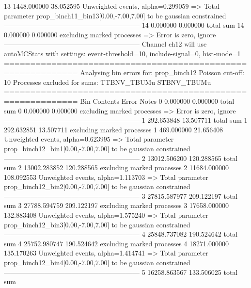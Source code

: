 13         1448.000000     38.052595       Unweighted events, alpha=0.299059
  => Total parameter prop_binch11_bin13[0.00,-7.00,7.00] to be gaussian constrained
------------------------------------------------------------
14         0.000000        0.000000        total sum                     
14         0.000000        0.000000        excluding marked processes    
  => Error is zero, ignore      
------------------------------------------------------------
Channel ch12 will use autoMCStats with settings: event-threshold=10, include-signal=0, hist-mode=1
============================================================
Analysing bin errors for: prop_binch12
Poisson cut-off: 10
Processes excluded for sums: TTBNV_TBUMu STBNV_TBUMu
============================================================
Bin        Contents        Error           Notes                         
0          0.000000        0.000000        total sum                     
0          0.000000        0.000000        excluding marked processes    
  => Error is zero, ignore      
------------------------------------------------------------
1          292.653848      13.507711       total sum                     
1          292.632851      13.507711       excluding marked processes    
1          469.000000      21.656408       Unweighted events, alpha=0.623995
  => Total parameter prop_binch12_bin1[0.00,-7.00,7.00] to be gaussian constrained
------------------------------------------------------------
2          13012.506200    120.288565      total sum                     
2          13002.283852    120.288565      excluding marked processes    
2          11684.000000    108.092553      Unweighted events, alpha=1.113703
  => Total parameter prop_binch12_bin2[0.00,-7.00,7.00] to be gaussian constrained
------------------------------------------------------------
3          27815.587977    209.122197      total sum                     
3          27788.594759    209.122197      excluding marked processes    
3          17658.000000    132.883408      Unweighted events, alpha=1.575240
  => Total parameter prop_binch12_bin3[0.00,-7.00,7.00] to be gaussian constrained
------------------------------------------------------------
4          25848.737082    190.524642      total sum                     
4          25752.980747    190.524642      excluding marked processes    
4          18271.000000    135.170263      Unweighted events, alpha=1.414741
  => Total parameter prop_binch12_bin4[0.00,-7.00,7.00] to be gaussian constrained
------------------------------------------------------------
5          16258.863567    133.506025      total sum                     
